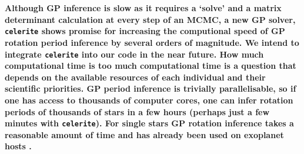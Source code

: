 \documentclass[a4paper,fleqn,usenatbib,useAMS]{mnras}
\newcommand{\eg}{{\it e.g.}}
\begin{document}
{\bf Although GP inference is slow as it requires a `solve' and a matrix
determinant calculation at every step of an MCMC, a new GP solver, {\tt
celerite} \citep{Foremanmackey2017} shows promise for increasing the
computional speed of GP rotation period inference by several orders of
magnitude.
We intend to integrate {\tt celerite} into our code in the near future.
How much computational time is too much computational time is a question that
depends on the available resources of each individual and their scientific
priorities.
GP period inference is trivially parallelisable, so if one has access to
thousands of computer cores, one can infer rotation periods of thousands of
stars in a few hours (perhaps just a few minutes with {\tt celerite}).
For single stars GP rotation inference takes a reasonable amount of time and
has already been used on exoplanet hosts \citep[\eg][]{Haywood2014,
Vanderburg2015}.

}
\end{document}
